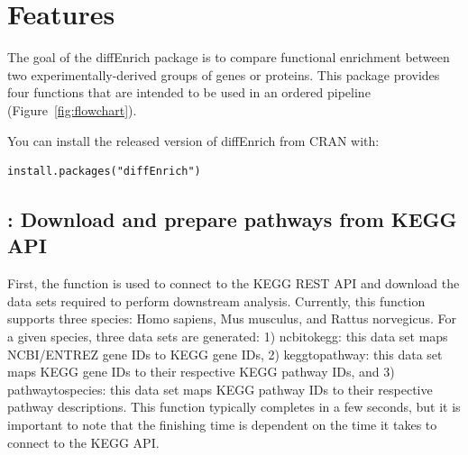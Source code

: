 \documentclass[article]{jss}\usepackage[]{graphicx}\usepackage[]{color}
\makeatletter
\newenvironment{kframe}{%
 \def\at@end@of@kframe{}%
 \ifinner\ifhmode%
  \def\at@end@of@kframe{\end{minipage}}%
  \begin{minipage}{\columnwidth}%
 \fi\fi%
 \def\FrameCommand##1{\hskip\@totalleftmargin \hskip-\fboxsep
 \colorbox{shadecolor}{##1}\hskip-\fboxsep
     \hskip-\linewidth \hskip-\@totalleftmargin \hskip\columnwidth}%
 \MakeFramed {\advance\hsize-\width
   \@totalleftmargin\z@ \linewidth\hsize
   \@setminipage}}%
 {\par\unskip\endMakeFramed%
 \at@end@of@kframe}
\newenvironment{knitrout}{}{} %
\makeatother
\begin{document}

\section[Features]{Features} \label{sec:feat}

The goal of the diffEnrich package is to compare functional enrichment between
two experimentally-derived groups of genes or proteins. This package provides
four functions that are intended to be used in an ordered pipeline
(Figure~\ref{fig:flowchart}).

\medskip

You can install the released version of diffEnrich from CRAN with:

\begin{knitrout}
\color{fgcolor}\begin{kframe}
\begin{lstlisting}[basicstyle=\ttfamily,breaklines=true]
install.packages("diffEnrich")\end{lstlisting}
\end{kframe}
\end{knitrout}

\subsection{: Download and prepare pathways from KEGG API}

First, the  function is used to connect to the
KEGG REST API and download the data sets required to perform downstream
analysis. Currently, this function supports three species: Homo sapiens, Mus
musculus, and Rattus norvegicus. For a given species, three data sets are
generated: 1) ncbi\textunderscore to\textunderscore kegg: this data set maps NCBI/ENTREZ gene IDs to KEGG gene
IDs, 2) kegg\textunderscore to\textunderscore pathway: this data set maps KEGG gene IDs to their respective
KEGG pathway IDs, and 3) pathway\textunderscore to\textunderscore species: this data set maps KEGG pathway IDs
to their respective pathway descriptions. This function typically completes in a
few seconds, but it is important to note that the finishing time is dependent on
the time it takes to connect to the KEGG API.
\end{document}
